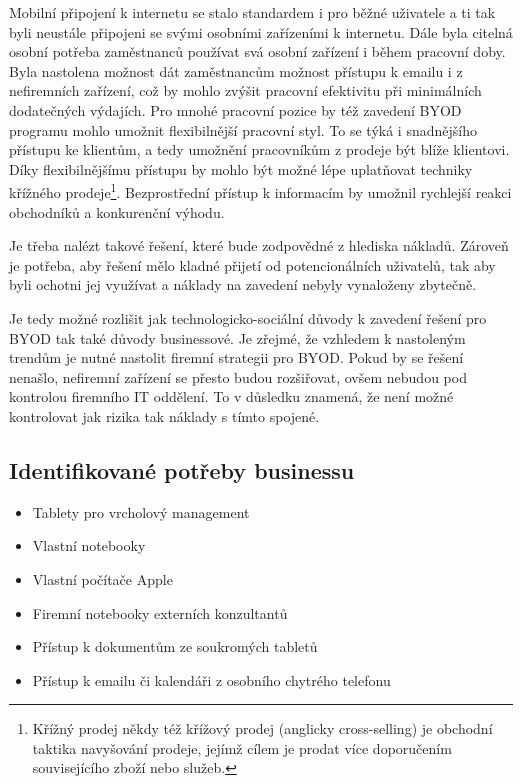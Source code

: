Mobilní připojení k internetu se stalo standardem i pro běžné uživatele a ti tak byli neustále připojeni se svými osobními zařízeními k internetu. Dále byla citelná osobní potřeba zaměstnanců používat svá osobní zařízení i během pracovní doby. Byla nastolena možnost dát zaměstnancům možnost přístupu k emailu i z nefiremních zařízení, což by mohlo zvýšit pracovní efektivitu při minimálních dodatečných výdajích. Pro mnohé pracovní pozice by též zavedení BYOD programu mohlo umožnit flexibilnější pracovní styl. To se týká i snadnějšího přístupu ke klientům, a tedy umožnění pracovníkům z prodeje být blíže klientovi. Díky flexibilnějšímu přístupu by mohlo být možné lépe uplatňovat techniky křížného prodeje\footnote{Křížný prodej někdy též křížový prodej (anglicky cross-selling) je obchodní taktika navyšování prodeje, jejímž cílem je prodat více doporučením souvisejícího zboží nebo služeb.}. Bezprostřední přístup k informacím by umožnil rychlejší reakci obchodníků a konkurenční výhodu. 

Je třeba nalézt takové řešení, které bude zodpovědné z hlediska nákladů. Zároveň je potřeba, aby řešení mělo kladné přijetí od potencionálních uživatelů, tak aby byli ochotni jej využívat a náklady na zavedení nebyly vynaloženy zbytečně.  

Je tedy možné rozlišit jak technologicko-sociální důvody k zavedení řešení pro BYOD tak také důvody businessové. Je zřejmé, že vzhledem k nastoleným trendům je nutné nastolit firemní strategii pro BYOD. Pokud by se řešení nenašlo, nefiremní zařízení se přesto budou rozšiřovat, ovšem nebudou pod kontrolou firemního IT oddělení. To v důsledku znamená, že není možné kontrolovat jak rizika tak náklady s tímto spojené. 


\subsection{Identifikované potřeby businessu}
\begin{itemize}
    \item Tablety pro vrcholový management
    \item Vlastní notebooky
    \item Vlastní počítače Apple
    \item Firemní notebooky externích konzultantů
    \item Přístup k dokumentům ze soukromých tabletů
    \item Přístup k emailu či kalendáři z osobního chytrého telefonu
\end{itemize}

